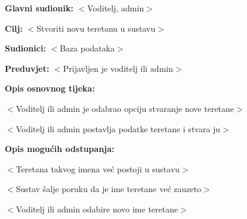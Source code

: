 					\noindent {}
					\begin{packed_item}
	
						\item \textbf{Glavni sudionik: } $<$Voditelj, admin$>$
						\item  \textbf{Cilj:} $<$Stvoriti novu teretanu u sustavu$>$
						\item  \textbf{Sudionici:} $<$Baza podataka$>$
						\item  \textbf{Preduvjet:} $<$Prijavljen je voditelj ili admin$>$
						\item  \textbf{Opis osnovnog tijeka:}
						
						\item[] \begin{packed_enum}
	
							\item $<$Voditelj ili admin je odabrao opciju stvaranje nove teretane$>$
							\item $<$Voditelj ili admin postavlja podatke teretane i stvara ju$>$
						\end{packed_enum}
						
						\item  \textbf{Opis mogućih odstupanja:}
						
						\item[] \begin{packed_item}
	
							\item[1.] $<$Teretana takvog imena već postoji u sustavu$>$
							\item[] \begin{packed_enum}
								
								\item[a)] $<$Sustav šalje poruku da je ime teretane već zauzeto$>$
								\item[b)] $<$Voditelj ili admin odabire novo ime teretane$>$
								
							\end{packed_enum}
	
							
						\end{packed_item}
					\end{packed_item}
					
